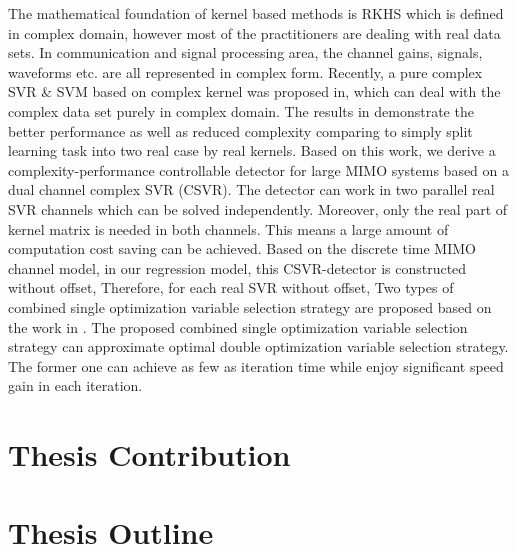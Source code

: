 The mathematical foundation of kernel based methods is RKHS which is defined in complex domain, however most of the practitioners are dealing with real data sets. In communication and signal processing area, the channel gains, signals, waveforms etc. are all represented in complex form. Recently, a pure complex SVR \& SVM based on complex kernel was proposed in\cite{bouboulis2013complex}, which can deal with the complex data set purely in complex domain. The results in\cite{bouboulis2013complex} demonstrate the better performance as well as reduced complexity comparing to simply split learning task into two real case by real kernels.  
Based on this work, we derive a complexity-performance controllable detector for large MIMO systems based on a dual channel complex SVR (CSVR). The detector can work in two parallel real SVR channels which can be solved independently. Moreover, only the real part of kernel matrix is needed in both channels. This means a large amount of computation cost saving can be achieved.
Based on the discrete time MIMO channel model, in our regression model, this CSVR-detector
is constructed without offset, Therefore, for each real SVR without offset, 
Two types of combined single optimization variable selection strategy are proposed based on the work in \cite{steinwart2011training}. The proposed combined single optimization variable selection strategy can approximate optimal double optimization variable selection strategy. The former one can achieve as few as iteration time while enjoy significant speed gain in each iteration.
\section{Thesis Contribution}
\section{Thesis Outline}